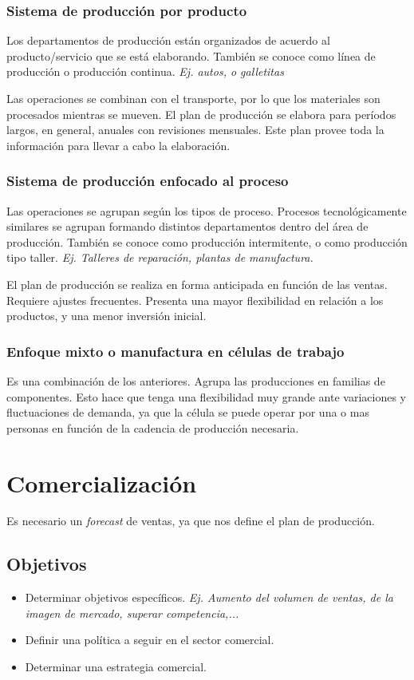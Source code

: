 \documentclass[titlepage,a4paper]{article}
\begin{document}
\subsubsection*{Sistema de producción por producto}
Los departamentos de producción están organizados de acuerdo al producto/servicio que se está elaborando. También se conoce como línea de producción o producción continua. \textit{Ej. autos, o galletitas}

Las operaciones se combinan con el transporte, por lo que los materiales son procesados mientras se mueven. El plan de producción se elabora para períodos largos, en general, anuales con revisiones mensuales. Este plan provee toda la información para llevar a cabo la elaboración. 


\subsubsection*{Sistema de producción enfocado al proceso}
Las operaciones se agrupan según los tipos de proceso. Procesos tecnológicamente similares se agrupan formando distintos departamentos dentro del área de producción. También se conoce como producción intermitente, o como producción tipo taller. \textit{Ej. Talleres de reparación, plantas de manufactura.}

El plan de producción se realiza en forma anticipada en función de las ventas. Requiere ajustes frecuentes. Presenta una mayor flexibilidad en relación a los productos, y una menor inversión inicial.

\subsubsection*{Enfoque mixto o manufactura en células de trabajo}
Es una combinación de los anteriores. Agrupa las producciones en familias de componentes. Esto hace que tenga una flexibilidad muy grande ante variaciones y fluctuaciones de demanda, ya que la célula se puede operar por una o mas personas en función de la cadencia de producción necesaria.

\section{Comercialización}

Es necesario un \textit{forecast} de ventas, ya que nos define el plan de producción.

\subsection*{Objetivos}
\begin{itemize}
    \item Determinar objetivos específicos. \textit{Ej. Aumento del volumen de ventas, de la imagen de mercado, superar competencia,...}
    \item Definir una política a seguir en el sector comercial.
    \item Determinar una estrategia comercial.
\end{itemize}
\end{document}
